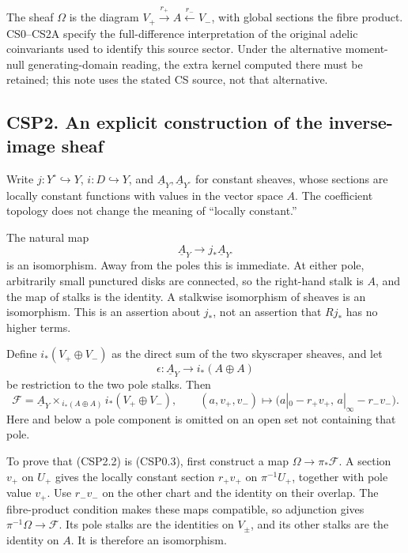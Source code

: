 The sheaf \(\Omega\) is the diagram
\(V_+\xrightarrow{r_+}A\xleftarrow{r_-}V_-\), with global sections the
fibre product. CS0--CS2A specify the full-difference interpretation of
the original adelic coinvariants used to identify this source sector.
Under the alternative moment-null generating-domain reading, the extra
kernel computed there must be retained; this note uses the stated CS
source, not that alternative.

\subsection{CSP2. An explicit construction of the inverse-image
sheaf}\label{csp2.-an-explicit-construction-of-the-inverse-image-sheaf}

Write \(j:Y^\circ\hookrightarrow Y\), \(i:D\hookrightarrow Y\), and
\(\underline A_Y,\underline A_{Y^\circ}\) for constant sheaves, whose
sections are locally constant functions with values in the vector space
\(A\). The coefficient topology does not change the meaning of ``locally
constant.''

The natural map \[
\underline A_Y\longrightarrow j_*\underline A_{Y^\circ}
\tag{CSP2.1}
\] is an isomorphism. Away from the poles this is immediate. At either
pole, arbitrarily small punctured disks are connected, so the right-hand
stalk is \(A\), and the map of stalks is the identity. A stalkwise
isomorphism of sheaves is an isomorphism. This is an assertion about
\(j_*\), not an assertion that \(Rj_*\) has no higher terms.

Define \(i_*(V_+\oplus V_-)\) as the direct sum of the two skyscraper
sheaves, and let \[
\epsilon:\underline A_Y\longrightarrow i_*(A\oplus A)
\] be restriction to the two pole stalks. Then \[
\boxed{\mathscr F
=\underline A_Y\times_{\,i_*(A\oplus A)}i_*(V_+\oplus V_-),}
\qquad
(a,v_+,v_-)\mapsto
\bigl(a|_0-r_+v_+,\,a|_\infty-r_-v_-\bigr).
\tag{CSP2.2}
\] Here and below a pole component is omitted on an open set not
containing that pole.

To prove that (CSP2.2) is (CSP0.3), first construct a map
\(\Omega\to\pi_*\mathscr F\). A section \(v_+\) on \(U_+\) gives the
locally constant section \(r_+v_+\) on \(\pi^{-1}U_+\), together with
pole value \(v_+\). Use \(r_-v_-\) on the other chart and the identity
on their overlap. The fibre-product condition makes these maps
compatible, so adjunction gives \(\pi^{-1}\Omega\to\mathscr F\). Its
pole stalks are the identities on \(V_\pm\), and its other stalks are
the identity on \(A\). It is therefore an isomorphism.

